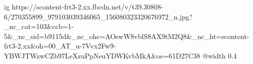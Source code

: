  
 
 
 
 

\ifcmt
  ig https://scontent-frt3-2.xx.fbcdn.net/v/t39.30808-6/270355899_979103039346065_156080323320676972_n.jpg?_nc_cat=103&ccb=1-5&_nc_sid=b9115d&_nc_ohc=AOswW8vblS8AX9tM2Q8&_nc_ht=scontent-frt3-2.xx&oh=00_AT_u-7Vvx2Fw9-YBWJTWzwCZb97LeXzuPpNeuYDWKvbMkA&oe=61D27C38
  @width 0.4
\fi
